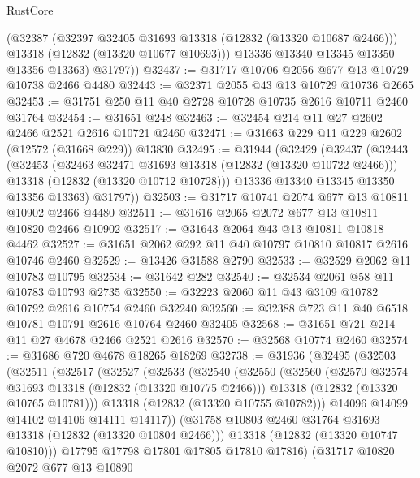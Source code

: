 \begin{lexlean}{RustCore}
\begin{coremodule}
          (@32387
            (@32397 @32405 @31693 @13318 (@12832 (@13320 @10687 @2466)))
            @13318
            (@12832 (@13320 @10677 @10693)))
          @13336
          @13340
          @13345
          @13350
          @13356
          @13363)
        @31797))
@32437 := @31717 @10706 @2056 @677 @13 @10729 @10738 @2466 @4480
@32443 := @32371 @2055 @43 @13 @10729 @10736 @2665
@32453 := @31751 @250 @11 @40 @2728 @10728 @10735 @2616 @10711 @2460 @31764
@32454 := @31651 @248
@32463 := @32454 @214 @11 @27 @2602 @2466 @2521 @2616 @10721 @2460
@32471 := @31663 @229 @11 @229 @2602 (@12572 (@31668 @229)) @13830
@32495 := @31944
    (@32429
      (@32437
        (@32443
          (@32453
            (@32463 @32471 @31693 @13318 (@12832 (@13320 @10722 @2466)))
            @13318
            (@12832 (@13320 @10712 @10728)))
          @13336
          @13340
          @13345
          @13350
          @13356
          @13363)
        @31797))
@32503 := @31717 @10741 @2074 @677 @13 @10811 @10902 @2466 @4480
@32511 := @31616 @2065 @2072 @677 @13 @10811 @10820 @2466 @10902
@32517 := @31643 @2064 @43 @13 @10811 @10818 @4462
@32527 := @31651 @2062 @292 @11 @40 @10797 @10810 @10817 @2616 @10746 @2460
@32529 := @13426 @31588 @2790
@32533 := @32529 @2062 @11 @10783 @10795
@32534 := @31642 @282
@32540 := @32534 @2061 @58 @11 @10783 @10793 @2735
@32550 := @32223 @2060 @11 @43 @3109 @10782 @10792 @2616 @10754 @2460 @32240
@32560 := @32388 @723 @11 @40 @6518 @10781 @10791 @2616 @10764 @2460 @32405
@32568 := @31651 @721 @214 @11 @27 @4678 @2466 @2521 @2616
@32570 := @32568 @10774 @2460
@32574 := @31686 @720 @4678 @18265 @18269
@32738 := @31936
    (@32495
      (@32503
        (@32511
          (@32517
            (@32527
              (@32533
                (@32540
                  (@32550
                    (@32560
                      (@32570 @32574 @31693 @13318 (@12832 (@13320 @10775 @2466)))
                      @13318
                      (@12832 (@13320 @10765 @10781)))
                    @13318
                    (@12832 (@13320 @10755 @10782)))
                  @14096
                  @14099
                  @14102
                  @14106
                  @14111
                  @14117))
              (@31758 @10803 @2460 @31764 @31693 @13318 (@12832 (@13320 @10804 @2466)))
              @13318
              (@12832 (@13320 @10747 @10810)))
            @17795
            @17798
            @17801
            @17805
            @17810
            @17816)
          (@31717
            @10820
            @2072
            @677
            @13
            @10890

\end{coremodule}
\end{lexlean}
